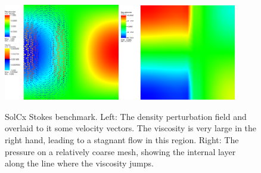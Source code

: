 \documentclass{article}
\begin{document}
\begin{figure}
  \begin{center}
    \includegraphics[width=0.45\textwidth]{cookbooks/benchmarks/solcx-solution}
    \hfill
    \includegraphics[width=0.45\textwidth]{cookbooks/benchmarks/solcx-solution-pressure}
    \caption{SolCx Stokes benchmark. Left: The density perturbation field and
      overlaid to it some velocity vectors. The viscosity is very large in the
      right hand, leading to a stagnant flow in this region. Right: The
      pressure on a relatively coarse mesh, showing the internal layer along
      the line where the viscosity jumps.}
    \label{fig:solcx}
  \end{center}
\end{figure}
\end{document}
